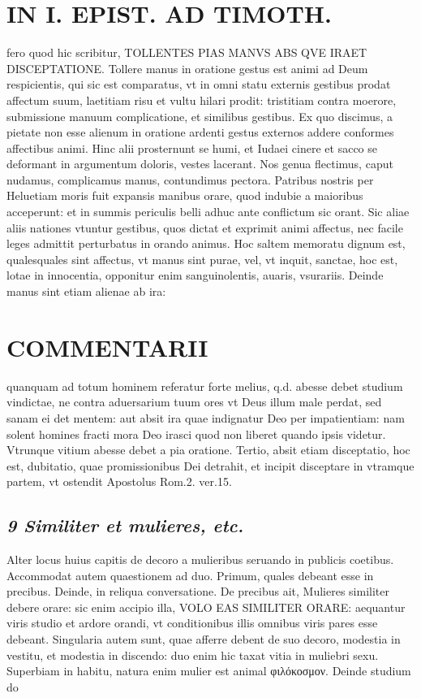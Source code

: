 \documentclass{article}
\begin{document}
\begin{pages}
\section*{IN I. EPIST. AD TIMOTH. }
\marginpar{[ p.53 ]}\pstart fero quod hic scribitur, TOLLENTES PIAS MANVS ABS QVE IRAET DISCEPTATIONE. Tollere manus in oratione gestus est animi ad Deum respicientis, qui sic est comparatus, vt in omni statu externis gestibus prodat affectum suum, laetitiam risu et vultu hilari prodit: tristitiam contra moerore, submissione manuum complicatione, et similibus gestibus. Ex quo discimus, a pietate non esse alienum in oratione ardenti gestus externos addere conformes affectibus animi. Hinc alii prosternunt se humi, et Iudaei cinere et sacco se deformant in argumentum doloris, vestes lacerant. Nos genua flectimus, caput nudamus, complicamus manus, contundimus pectora. Patribus nostris per Heluetiam moris fuit expansis manibus orare, quod indubie a maioribus acceperunt: et in summis periculis belli adhuc ante conflictum sic orant.  \pend\pstart Sic aliae aliis nationes vtuntur gestibus, quos dictat et exprimit animi affectus, nec facile leges admittit perturbatus in orando animus.  \pend\pstart Hoc saltem memoratu dignum est, qualesquales sint affectus, vt manus sint purae, vel, vt inquit, sanctae, hoc est, lotae in innocentia, opponitur enim sanguinolentis, auaris, vsurariis. Deinde manus sint etiam alienae ab ira:  \pend
\section*{COMMENTARII }
\marginpar{[ p.5 ]}\pstart quanquam ad totum hominem referatur forte melius, q.d. abesse debet studium vindictae, ne contra aduersarium tuum ores vt Deus illum male perdat, sed sanam ei det mentem: aut absit ira quae indignatur Deo per impatientiam: nam solent homines fracti mora Deo irasci quod non liberet quando ipsis videtur. Vtrunque vitium abesse debet a pia oratione. Tertio, absit etiam disceptatio, hoc est, dubitatio, quae promissionibus Dei detrahit, et incipit disceptare in vtramque partem, vt ostendit Apostolus Rom.2. ver.15.  \pend
{}
{}
\subsection*{\textit{9 Similiter et mulieres, etc. }}\pstart Alter locus huius capitis de decoro a mulieribus seruando in publicis coetibus. Accommodat autem quaestionem ad duo. Primum, quales debeant esse in precibus. Deinde, in reliqua conversatione.  \pend\pstart De precibus ait, Mulieres similiter debere orare: sic enim accipio illa, VOLO EAS SIMILITER ORARE: aequantur viris studio et ardore orandi, vt conditionibus illis omnibus viris pares esse debeant. Singularia autem sunt, quae afferre debent de suo decoro, modestia in vestitu, et modestia in discendo: duo enim hic taxat vitia in muliebri sexu. Superbiam in habitu, natura enim mulier est animal φιλόκοσμον. Deinde studium do\pend

\end{pages}
\end{document}
